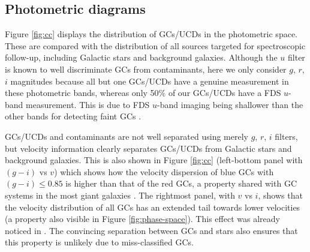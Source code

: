 \documentclass[usenatbib]{mnras}
\begin{document}
\subsection{Photometric diagrams}


Figure \ref{fig:cc} displays the distribution of GCs/UCDs in the photometric 
space. These are compared with the distribution of all sources targeted for 
spectroscopic follow-up, including Galactic stars and background galaxies. 
Although the $u$ filter is known to well discriminate GCs from contaminants, 
here we only consider $g$, $r$, $i$ magnitudes because all but one GCs/UCDs 
have a genuine measurement in these photometric bands, whereas only 50\% of our 
GCs/UCDs have a FDS $u$-band measurement. This is due to FDS $u$-band imaging being 
shallower than the other bands for detecting faint GCs \citep{DAbrusco16}.

GCs/UCDs and contaminants are not well separated using merely $g$, $r$, $i$ 
filters, but velocity information clearly separates GCs/UCDs from Galactic 
stars and background galaxies. This is also shown in Figure \ref{fig:cc} 
(left-bottom panel with $(g-i)$ vs $v$) which shows how the velocity 
dispersion of blue GCs with $(g-i) \le 0.85$ is higher than that of the red GCs, a 
property shared with GC systems in the most giant galaxies \citep[e.g.,][]{Pota13}. 
The rightmost panel, with $v$ vs $i$, shows that 
the velocity distribution of all GCs has an extended tail towards lower velocities (a 
property also visible in Figure \ref{fig:phase-space}). This effect was already 
noticed in \citet{Schuberth}. The convincing separation between GCs and stars 
also ensures that this property is unlikely due to miss-classified GCs. 
\end{document}
